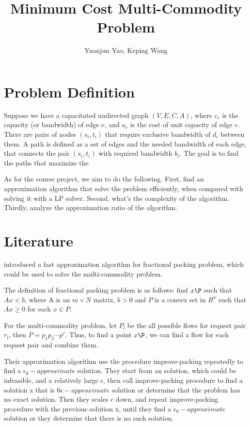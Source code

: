 \documentclass[a4paper]{article}
\title{Minimum Cost Multi-Commodity Problem}
\author{Yuanjun Yao, Keping Wang}
\begin{document}
\maketitle


\section{Problem Definition}

Suppose we have a capacitated  undirected graph $(V, E, C,A)$,
where $c_e$ is the capacity (or bandwidth) of edge $e$, and $a_e$ is the cost of unit capacity of edge $e$. There are pairs of nodes $(s_i,t_i)$ that require exclusive bandwidth of $d_i$ between them. A path is defined as a set of edges and the needed bandwidth of each edge, that connects the pair $(s_i,t_i)$ with required bandwidth $b_i$. The goal is to find the paths that maximize the 

As for the course project, we aim to do the following. First, find an approximation algorithm that solve the problem efficiently, when compared with solving it with a LP solver. Second, what's the complexity of the algorithm. Thirdly, analyze the approximation ratio of the algorithm.

\section{Literature}
\cite{plotkin1995fast} introduced a fast approximation algorithm for fractional packing problem, which could be used to solve the multi-commodity problem. 

The definition of fractional packing problem is as follows: find $x\P$ such that $Ax<b$, where A is an $m\times N$ matrix, $b>0$ and $P$ is a convex set in $R^n$ such that $Ax\geq 0$ for each $x\in P$.

For the multi-commodity problem, let $P_l$ be the all possible flows for request pair $r_l$, then $P=p_1 p_2\cdots p^r$. Thus, to find a point $x\P$, we can find a flow for each request pair and combine them.

Their approximation algorithm use the procedure improve-packing repeatedly to find a $\epsilon_0-approximate$ solution. They start from an solution, which could be infeasible, and a relatively large $\epsilon$, then call improve-packing procedure to find a solution x
that is $6\epsilon-approximate$ solution or determine that the problem has no exact solution. Then they scales $\epsilon$ down, and repeat improve-packing procedure with the previous solution x, until they find a $\epsilon_0-approximate$ solution or they determine that there is no such solution.
\end{document}
